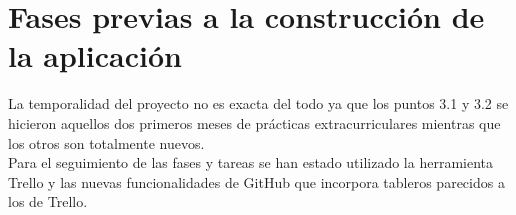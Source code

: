 \chapter{Fases previas a la construcción de la aplicación}
\graphicspath{{imagenes/estructura_y_desarrollo/}}

La temporalidad del proyecto no es exacta del todo ya que los puntos 3.1 y 3.2 se hicieron aquellos dos primeros meses de prácticas extracurriculares mientras que los otros son totalmente nuevos.
\\Para el seguimiento de las fases y tareas se han estado utilizado la herramienta Trello y las nuevas funcionalidades de GitHub que incorpora tableros parecidos a los de Trello.



